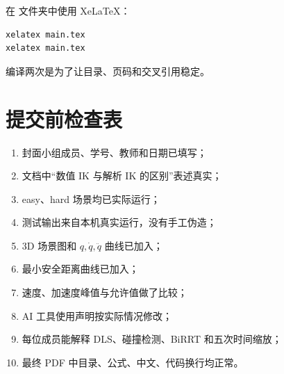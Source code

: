 在  文件夹中使用 XeLaTeX：
\begin{lstlisting}[language={}]
xelatex main.tex
xelatex main.tex
\end{lstlisting}
编译两次是为了让目录、页码和交叉引用稳定。

\section{提交前检查表}

\begin{enumerate}
  \item 封面小组成员、学号、教师和日期已填写；
  \item 文档中“数值 IK 与解析 IK 的区别”表述真实；
  \item easy、hard 场景均已实际运行；
  \item 测试输出来自本机真实运行，没有手工伪造；
  \item 3D 场景图和 $q,\dot q,\ddot q$ 曲线已加入；
  \item 最小安全距离曲线已加入；
  \item 速度、加速度峰值与允许值做了比较；
  \item AI 工具使用声明按实际情况修改；
  \item 每位成员能解释 DLS、碰撞检测、BiRRT 和五次时间缩放；
  \item 最终 PDF 中目录、公式、中文、代码换行均正常。
\end{enumerate}
